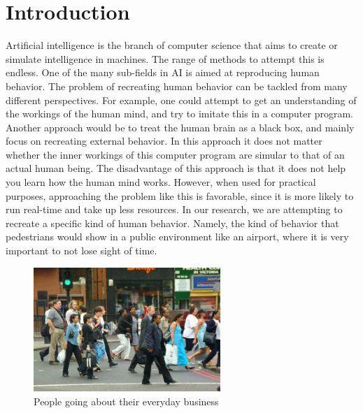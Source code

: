 \documentclass[11pt, a4paper]{book}
\begin{document}
\chapter{Introduction}
Artificial intelligence is the branch of computer science that aims to create or simulate intelligence in machines. The range of methods to attempt this is endless. One of the many sub-fields in AI is aimed at reproducing human behavior. The problem of recreating human behavior can be tackled from many different perspectives. For example, one could attempt to get an understanding of the workings of the human mind, and try to imitate this in a computer program. Another approach would be to treat the human brain as a black box, and mainly focus on recreating external behavior. In this approach it does not matter whether the inner workings of this computer program are simular to that of an actual human being. The disadvantage of this approach is that it does not help you learn how the human mind works. However, when used for practical purposes, approaching the problem like this is favorable, since it is more likely to run real-time and take up less resources. In our research, we are attempting to recreate a specific kind of human behavior. Namely, the kind of behavior that pedestrians would show in a public environment like an airport,  where it is very important to not lose sight of time.\\
\begin{figure}[h]
\begin{center}
\includegraphics[width=200pt]{pedestrians.jpg}
\end{center}
\caption{People going about their everyday business}
\label{pedestrianpicture}
\end{figure}
\end{document}
